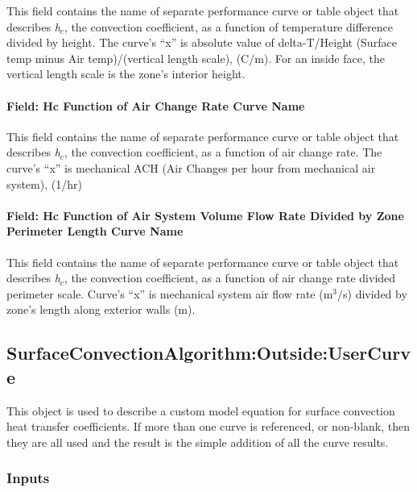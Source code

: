 This field contains the name of separate performance curve or table object that describes \emph{h\(_{c}\)}, the convection coefficient, as a function of temperature difference divided by height. The curve's ``x'' is absolute value of delta-T/Height (Surface temp minus Air temp)/(vertical length scale), (C/m). For an inside face, the vertical length scale is the zone's interior height.

\paragraph{Field: Hc Function of Air Change Rate Curve Name}\label{field-hc-function-of-air-change-rate-curve-name}

This field contains the name of separate performance curve or table object that describes \emph{h\(_{c}\)}, the convection coefficient, as a function of air change rate. The curve's ``x'' is mechanical ACH (Air Changes per hour from mechanical air system), (1/hr)

\paragraph{Field: Hc Function of Air System Volume Flow Rate Divided by Zone Perimeter Length Curve Name}\label{field-hc-function-of-air-system-volume-flow-rate-divided-by-zone-perimeter-length-curve-name}

This field contains the name of separate performance curve or table object that describes \emph{h\(_{c}\)}, the convection coefficient, as a function of air change rate divided perimeter scale. Curve's ``x'' is mechanical system air flow rate (m\(^{3}\)/s) divided by zone's length along exterior walls (m).

\subsection{SurfaceConvectionAlgorithm:Outside:UserCurve}\label{surfaceconvectionalgorithmoutsideusercurve}

This object is used to describe a custom model equation for surface convection heat transfer coefficients. If more than one curve is referenced, or non-blank, then they are all used and the result is the simple addition of all the curve results.

\subsubsection{Inputs}\label{inputs-9}

